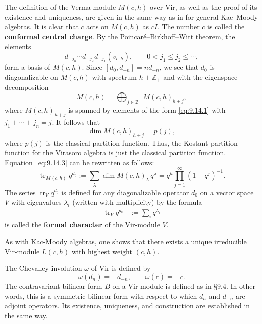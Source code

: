 \documentclass[12pt]{article}
\begin{document}
The definition of the Verma module $M(c,h)$ over $\mathrm{Vir}$,
as well as the proof of its existence and uniqueness, are given in
the same way as in for general Kac--Moody algebras. It is clear that $c$ acts on $M(c,h)$ as $cI$. The number $c$ is called the \textbf{conformal central charge}.
By the Poincaré–Birkhoff–Witt theorem, the elements
\begin{equation}\label{eq:9.14.1}
    d_{-j_n}\cdots d_{-j_2} d_{-j_1}(v_{c,h}),
    \qquad 0 < j_1 \le j_2 \le \cdots,
\end{equation}
form a basis of $M(c,h)$. Since $[d_0,d_{-n}] = n d_{-n}$, we see
that $d_0$ is diagonalizable on $M(c,h)$ with spectrum
$h + \mathbb{Z}_+$ and with the eigenspace decomposition
\begin{equation}\label{eq:9.14.2}
    M(c,h) = \bigoplus_{j \in \mathbb{Z}_+} M(c,h)_{h+j},
\end{equation}
where $M(c,h)_{h+j}$ is spanned by elements of the form
\eqref{eq:9.14.1} with $j_1 + \cdots + j_n = j$.
It follows that
\begin{equation}\label{eq:9.14.3}
    \dim M(c,h)_{h+j} = p(j),
\end{equation}
where $p(j)$ is the classical partition function. Thus, the Kostant
partition function for the Virasoro algebra is just the classical
partition function.
Equation~\eqref{eq:9.14.3} can be rewritten as follows:
\[
    \operatorname{tr}_{M(c,h)} q^{d_0}
    := \sum_\lambda \dim M(c,h)_\lambda\, q^\lambda
    = q^h \prod_{j=1}^\infty (1 - q^j)^{-1}.
\]
The series $\operatorname{tr}_V q^{d_0}$ is defined for any diagonalizable operator $d_0$ on a vector space $V$ with eigenvalues $\lambda_i$ (written with multiplicity) by the formula
\begin{align*}
    \operatorname{tr}_V q^{d_0}
     & := \sum_i q^{\lambda_i}
\end{align*}
is called the
\textbf{formal character} of the $\mathrm{Vir}$-module $V$.

As with Kac-Moody algebras, one shows that there exists a unique irreducible
$\mathrm{Vir}$-module $L(c,h)$ with highest weight $(c,h)$.

The Chevalley involution $\omega$ of $\mathrm{Vir}$ is defined by
\begin{equation}\label{eq:9.14.4}
    \omega(d_n) = -d_{-n}, \qquad \omega(c) = -c.
\end{equation}
The contravariant bilinear form $B$ on a $\mathrm{Vir}$-module is
defined as in \S9.4. In other words, this is a symmetric bilinear
form with respect to which $d_n$ and $d_{-n}$ are adjoint operators.
Its existence, uniqueness, and construction are established in the
same way.
\end{document}
